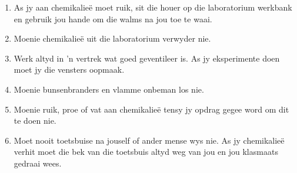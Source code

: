\begin{table}[H]
\begin{enumerate}[noitemsep, label=\textbf{\arabic*}. ]
\item As jy aan chemikalieë moet ruik, sit die houer op die laboratorium werkbank en gebruik jou hande om die walms na jou toe te waai.
\item Moenie chemikalieë uit die laboratorium verwyder nie.
\item Werk altyd in  'n vertrek wat goed geventileer is. As jy eksperimente doen moet jy die vensters oopmaak.
\item Moenie bunsenbranders en vlamme onbeman los nie.
\item Moenie ruik, proe of vat aan chemikalieë tensy jy opdrag gegee word om dit te doen nie.
\item Moet nooit toetsbuise na jouself of ander mense wys nie. As jy chemikalieë verhit moet die bek van die toetsbuis altyd weg van jou en jou klasmaats gedraai wees.
\end{enumerate}
\par 

\end{table}

